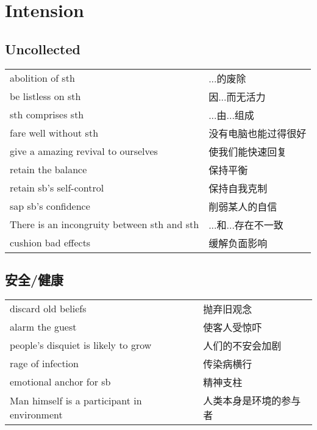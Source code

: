 \section{Intension}

\subsection{Uncollected}

\begin{tabular}{ll}
    abolition of sth                            & ...的废除       \\
    be listless on sth                          & 因...而无活力     \\
    sth comprises sth                           & ...由...组成    \\
    fare well without sth                       & 没有电脑也能过得很好   \\
    give a amazing revival to ourselves         & 使我们能快速回复     \\
    retain the balance                          & 保持平衡         \\
    retain sb's self-control                    & 保持自我克制       \\
    sap sb's confidence                         & 削弱某人的自信      \\
    There is an incongruity between sth and sth & ...和...存在不一致 \\
    cushion bad effects                         & 缓解负面影响       \\
\end{tabular}

\subsection{安全/健康}

\begin{tabular}{ll}
    discard old beliefs                         & 抛弃旧观念       \\
    alarm the guest                             & 使客人受惊吓      \\
    people's disquiet is likely to grow         & 人们的不安会加剧    \\
    rage of infection                           & 传染病横行       \\
    emotional anchor for sb                     & 精神支柱        \\
    Man himself is a participant in environment & 人类本身是环境的参与者 \\
\end{tabular}

